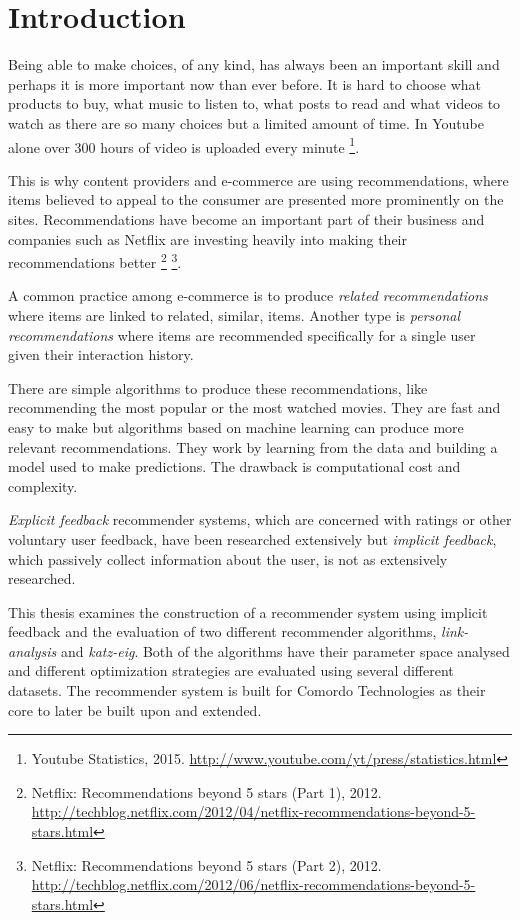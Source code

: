 
\section{Introduction}\label{sec:intro:intro}

Being able to make choices, of any kind, has always been an important skill and perhaps it is more important now than ever before. It is hard to choose what products to buy, what music to listen to, what posts to read and what videos to watch as there are so many choices but a limited amount of time. In Youtube alone over 300 hours of video is uploaded every minute
\footnote{Youtube Statistics, 2015. \url{http://www.youtube.com/yt/press/statistics.html}}.

This is why content providers and e-commerce are using recommendations, where items believed to appeal to the consumer are presented more prominently on the sites. Recommendations have become an important part of their business and companies such as Netflix are investing heavily into making their recommendations better
\footnote{
Netflix: Recommendations beyond 5 stars (Part 1), 2012.
\url{http://techblog.netflix.com/2012/04/netflix-recommendations-beyond-5-stars.html}
}
\footnote{
Netflix: Recommendations beyond 5 stars (Part 2), 2012.
\url{http://techblog.netflix.com/2012/06/netflix-recommendations-beyond-5-stars.html}
}.

A common practice among e-commerce is to produce \textit{related recommendations} where items are linked to related, similar, items. Another type is \textit{personal recommendations} where items are recommended specifically for a single user given their interaction history.

There are simple algorithms to produce these recommendations, like recommending the most popular or the most watched movies. They are fast and easy to make but algorithms based on machine learning can produce more relevant recommendations. They work by learning from the data and building a model used to make predictions. The drawback is computational cost and complexity.

\textit{Explicit feedback} recommender systems, which are concerned with ratings or other voluntary user feedback, have been researched extensively but \textit{implicit feedback}, which passively collect information about the user, is not as extensively researched. \citep{hu2008collaborative, bobadilla2013recommender, takacs2012alternating}

This thesis examines the construction of a recommender system using implicit feedback and the evaluation of two different recommender algorithms, \textit{link-analysis} and \textit{katz-eig}. Both of the algorithms have their parameter space analysed and different optimization strategies are evaluated using several different datasets. The recommender system is built for Comordo Technologies as their core to later be built upon and extended.

